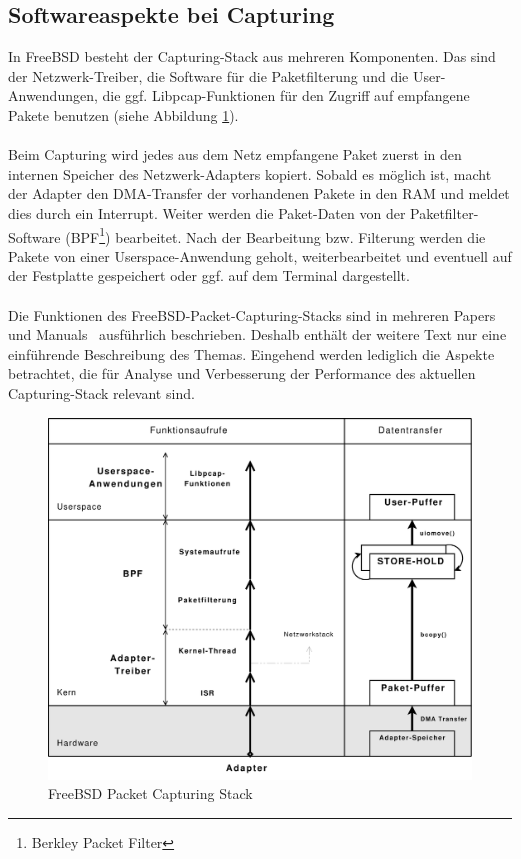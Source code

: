 \subsection{Softwareaspekte bei Capturing}\label{subsec:sw_cap}
In FreeBSD besteht der Capturing-Stack aus mehreren Komponenten.  Das sind der
Netzwerk-Treiber, die Software für die Paketfilterung und die
User-Anwendungen, die ggf.  Libpcap-Funktionen für den Zugriff auf empfangene
Pakete benutzen (siehe Abbildung \ref{bsd_cap_stack}).\\\\
%
Beim Capturing wird jedes aus dem Netz empfangene Paket zuerst in den internen
Speicher des Netzwerk-Adapters kopiert. Sobald es möglich ist, macht der
Adapter den DMA-Transfer der vorhandenen Pakete in den RAM und meldet dies
durch ein Interrupt. Weiter werden die Paket-Daten von der Paketfilter-Software
(BPF\footnote{Berkley Packet Filter}) bearbeitet. Nach der Bearbeitung bzw.
Filterung werden die Pakete von einer Userspace-Anwendung geholt,
weiterbearbeitet und eventuell auf der Festplatte gespeichert oder ggf. auf dem
Terminal dargestellt.\\\\
%
Die Funktionen des FreeBSD-Packet-Capturing-Stacks sind in mehreren
Papers~\cite{bpf_paper, fabian_da} und Manuals~\cite{man_bpf} ausführlich
beschrieben.  Deshalb enthält der weitere Text nur eine einführende
Beschreibung des Themas.  Eingehend werden lediglich die Aspekte betrachtet,
die für Analyse und Verbesserung der Performance des aktuellen Capturing-Stack
relevant sind.
\begin{figure}
\centering \includegraphics[width=5.1in]{bilder/3copy}
\caption{FreeBSD Packet Capturing Stack}
\label{bsd_cap_stack}
\end{figure}
%

